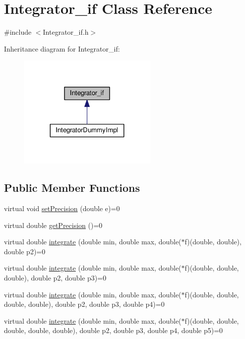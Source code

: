 \hypertarget{class_integrator__if}{}\section{Integrator\+\_\+if Class Reference}
\label{class_integrator__if}


{\ttfamily \#include $<$Integrator\+\_\+if.\+h$>$}



Inheritance diagram for Integrator\+\_\+if\+:
\nopagebreak
\begin{figure}[H]
\begin{center}
\leavevmode
\includegraphics[width=191pt]{class_integrator__if__inherit__graph}
\end{center}
\end{figure}
\subsection*{Public Member Functions}
\begin{DoxyCompactItemize}
\item 
virtual void \hyperlink{class_integrator__if_a49c27818a4b0caf41c39d22a18b41337}{set\+Precision} (double e)=0
\item 
virtual double \hyperlink{class_integrator__if_af3ab4e8ffa96c8970b2e3c980f84e89d}{get\+Precision} ()=0
\item 
virtual double \hyperlink{class_integrator__if_a841c836fd72d4c428178d1e28a999ec9}{integrate} (double min, double max, double($\ast$f)(double, double), double p2)=0
\item 
virtual double \hyperlink{class_integrator__if_a193d992d6101517249d9bee153607aa6}{integrate} (double min, double max, double($\ast$f)(double, double, double), double p2, double p3)=0
\item 
virtual double \hyperlink{class_integrator__if_a306e4fcb840f789d7a918550fa20cc28}{integrate} (double min, double max, double($\ast$f)(double, double, double, double), double p2, double p3, double p4)=0
\item 
virtual double \hyperlink{class_integrator__if_abaeac01142a4da07ba0f07a52732ac79}{integrate} (double min, double max, double($\ast$f)(double, double, double, double, double), double p2, double p3, double p4, double p5)=0
\end{DoxyCompactItemize}


